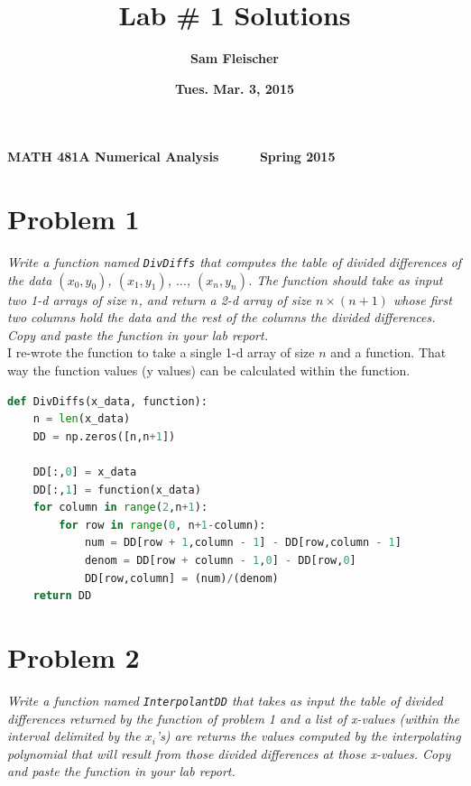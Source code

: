 \documentclass[12pt]{article}
\begin{document}
{\bf MATH 481A \hfill Numerical Analysis \ \ \ \ \ \hfill Spring 2015}

\title{\bf Lab \# 1 Solutions}
\author{\bf Sam Fleischer}
\date{\bf Tues. Mar. 3, 2015}

{\let\newpage\relax\maketitle}
\maketitle
\tableofcontents
\pagebreak

\section*{Problem 1}
{\it Write a function named {\tt DivDiffs} that computes the table of divided differences of
the data $(x_0, y_0)$, $(x_1, y_1)$, $\dots$, $(x_n, y_n)$.  The function should take as input two 1-d arrays of size $n$, and return a 2-d array of size $n \times (n + 1)$ whose first two columns hold the data and the rest of the columns the divided differences.  Copy and paste the function in your lab report.}\\

\noindent I re-wrote the function to take a single 1-d array of size $n$ and a function.  That way the function values (y values) can be calculated within the function.
\begin{lstlisting}[language=Python, caption=Divided Differences Function] 
def DivDiffs(x_data, function):
    n = len(x_data)
    DD = np.zeros([n,n+1])

    DD[:,0] = x_data
    DD[:,1] = function(x_data)
    for column in range(2,n+1):
        for row in range(0, n+1-column):
            num = DD[row + 1,column - 1] - DD[row,column - 1]
            denom = DD[row + column - 1,0] - DD[row,0]
            DD[row,column] = (num)/(denom)
    return DD
\end{lstlisting}


\section*{Problem 2}
{\it Write a function named {\tt InterpolantDD} that takes as input the table of divided differences returned by the function of problem 1 and a list of x-values (within the interval delimited by the $x_i$'s) are returns the values computed by the interpolating polynomial that will result from those divided differences at those x-values.  Copy and paste the function in your lab report.}\\
\end{document}
